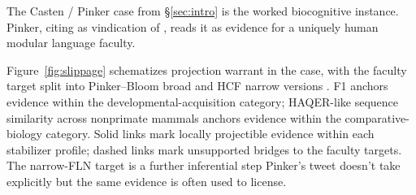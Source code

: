 \documentclass[12pt]{article}
\begin{document}
The Casten / Pinker case from §\ref{sec:intro} is the worked biocognitive instance. Pinker, citing \textcite{casten2026} as vindication of \textcite{pinkerbloom1990}, reads it as evidence for a uniquely human modular language faculty.

Figure~\ref{fig:slippage} schematizes projection warrant in the case, with the faculty target split into Pinker--Bloom broad and HCF narrow versions \citep{pinkerbloom1990, hauser2002}. F1 anchors evidence within the developmental-acquisition category; HAQER-like sequence similarity across nonprimate mammals anchors evidence within the comparative-biology category. Solid links mark locally projectible evidence within each stabilizer profile; dashed links mark unsupported bridges to the faculty targets. The narrow-FLN target is a further inferential step Pinker's tweet doesn't take explicitly but the same evidence is often used to license.
\end{document}
